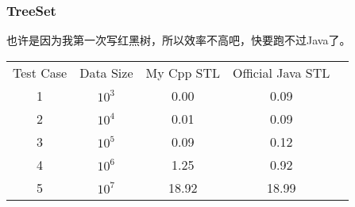 \subsubsection{TreeSet}

也许是因为我第一次写红黑树，所以效率不高吧，快要跑不过Java了。

\begin{center}
\begin{tabular}{ccccc}
Test Case&Data Size&My Cpp STL & Official Java STL\\
1&$10^3$&0.00&0.09\\
2&$10^4$&0.01&0.09\\
3&$10^5$&0.09&0.12\\
4&$10^6$&1.25&0.92\\
5&$10^7$&18.92&18.99\\ 
\end{tabular}
\end{center}
